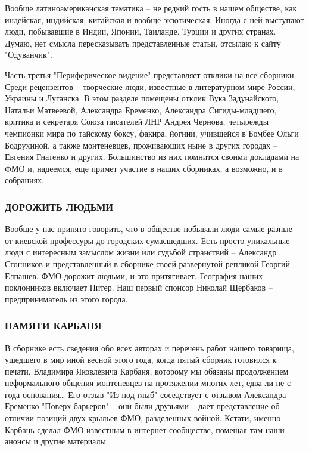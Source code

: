 Вообще латиноамериканская тематика – не редкий гость в нашем обществе, как
индейская, индийская, китайская и вообще экзотическая. Иногда с ней выступают
люди, побывавшие в Индии, Японии, Таиланде, Турции и других странах. Думаю, нет
смысла пересказывать представленные статьи, отсылаю к сайту "Одуванчик".

Часть третья "Периферическое видение" представляет отклики на все сборники.
Среди рецензентов – творческие люди, известные в литературном мире России,
Украины и Луганска. В этом разделе помещены отклик Вука Задунайского, Натальи
Матвеевой, Александра Еременко, Александра Сигиды-младшего, критика и секретаря
Союза писателей ЛНР Андрея Чернова, четырежды чемпионки мира по тайскому боксу,
факира, йогини, учившейся в Бомбее Ольги Бодрухиной, а также монтеневцев,
проживающих ныне в других городах – Евгения Гнатенко и других. Большинство из
них помнится своими докладами на ФМО и, надеемся, еще примет участие в наших
сборниках, а возможно, и в собраниях.

\subsubsection{ДОРОЖИТЬ ЛЮДЬМИ}

Вообще у нас принято говорить, что в обществе побывали люди самые разные – от
киевской профессуры до городских сумасшедших. Есть просто уникальные люди с
интересным замыслом жизни или судьбой странствий – Александр Сгонников и
представленный в сборнике своей развернутой репликой Георгий Елпашев. ФМО
дорожит людьми, и это притягивает. География наших поклонников включает Питер.
Наш первый спонсор Николай Щербаков – предприниматель из этого города.

\subsubsection{ПАМЯТИ КАРБАНЯ}

В сборнике есть сведения обо всех авторах и перечень работ нашего товарища,
ушедшего в мир иной весной этого года, когда пятый сборник готовился к печати,
Владимира Яковлевича Карбаня, которому мы обязаны продолжением неформального
общения монтеневцев на протяжении многих лет, едва ли не с года основания… Его
отзыв "Из-под глыб" соседствует с отзывом Александра Еременко "Поверх барьеров"
– они были друзьями – дает представление об отличии позиций двух крыльев ФМО,
разделенных войной.  Кстати, именно Карбань сделал ФМО известным в
интернет-сообществе, помещая там наши анонсы и другие материалы.

